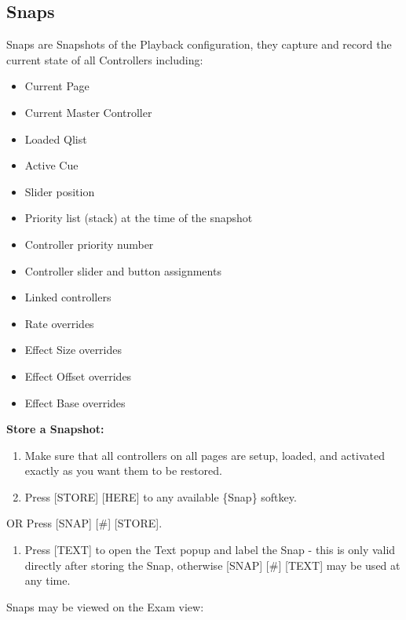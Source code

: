 \documentclass[
]{article}
\providecommand{\tightlist}{%
  \setlength{\itemsep}{0pt}\setlength{\parskip}{0pt}}
\begin{document}
\hypertarget{Store-Snaps-12.1}{%
\subsection{Snaps}\label{Store-Snaps-12.1}}

Snaps are Snapshots of the Playback configuration, they capture and record the current state of all Controllers including:

\begin{itemize}
\item
  Current Page
\item
  Current Master Controller
\item
  Loaded Qlist
\item
  Active Cue
\item
  Slider position
\item
  Priority list (stack) at the time of the snapshot
\item
  Controller priority number
\item
  Controller slider and button assignments
\item
  Linked controllers
\item
  Rate overrides
\item
  Effect Size overrides
\item
  Effect Offset overrides
\item
  Effect Base overrides
\end{itemize}

\textbf{Store a Snapshot:}

\begin{enumerate}
\def\labelenumi{\arabic{enumi}.}
\item
  Make sure that all controllers on all pages are setup, loaded, and activated exactly as you want them to be restored.
\item
  Press {[}STORE{]} {[}HERE{]} to any available \{Snap\} softkey.
\end{enumerate}

OR Press {[}SNAP{]} {[}\#{]} {[}STORE{]}.

\begin{enumerate}
\def\labelenumi{\arabic{enumi}.}
\setcounter{enumi}{2}
\tightlist
\item
  Press {[}TEXT{]} to open the Text popup and label the Snap - this is only valid directly after storing the Snap, otherwise {[}SNAP{]} {[}\#{]} {[}TEXT{]} may be used at any time.
\end{enumerate}

Snaps may be viewed on the Exam view:
\end{document}
